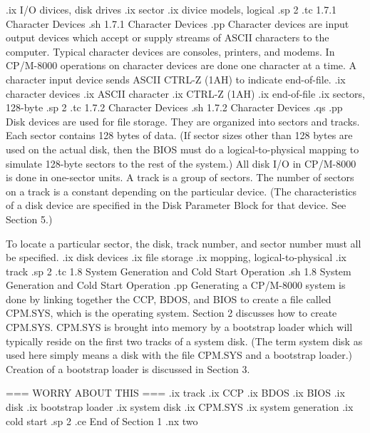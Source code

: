 .ix I/O divices, disk drives
.ix sector
.ix divice models, logical
.sp 2
.tc         1.7.1  Character Devices
.sh
1.7.1  Character Devices
.pp
Character devices are input output devices which accept or supply
streams of ASCII characters to the computer.  Typical character devices are
consoles, printers, and modems.  In CP/M-8000 operations on character devices
are done one character at a time.  A character input device sends ASCII
CTRL-Z (1AH) to indicate end-of-file.
.ix character devices
.ix ASCII character
.ix CTRL-Z (1AH)
.ix end-of-file
.ix sectors, 128-byte
.sp 2
.tc         1.7.2  Character Devices
.sh
1.7.2  Character Devices
.qs
.pp
Disk devices are used for file storage.  They are organized into sectors and 
tracks.  Each sector contains 128 bytes of data.  (If sector sizes other than
128 bytes are used on the actual disk, then the BIOS must do a 
logical-to-physical mapping to simulate 128-byte sectors to the rest of the 
system.)
All disk I/O in CP/M-8000 is done in one-sector units.  A track is a group of
sectors.  The number of sectors on a track is a constant depending on the
particular device.  (The characteristics of a disk device are specified in
the  Disk  Parameter  Block for  that  device.  See Section 5.)

To locate a particular sector, the disk, track number,
and sector number must all be specified.
.ix disk devices
.ix file storage
.ix mopping, logical-to-physical
.ix track
.sp 2
.tc    1.8  System Generation and Cold Start Operation
.sh
1.8  System Generation and Cold Start Operation
.pp
Generating a CP/M-8000 system is done by linking together the CCP, BDOS, and
BIOS to create a file called CPM.SYS, which is the operating system.
Section 2 discusses how to create CPM.SYS.  CPM.SYS is brought into memory
by a bootstrap loader which will typically reside on the first two tracks
of a system disk.  (The term system disk as used here simply means a disk
with the file CPM.SYS and a bootstrap loader.)  Creation of a bootstrap loader
is discussed in Section 3.

		=== WORRY ABOUT THIS ===
.ix track
.ix CCP
.ix BDOS
.ix BIOS
.ix disk
.ix bootstrap loader
.ix system disk
.ix CPM.SYS
.ix system generation
.ix cold start
.sp 2
.ce
End of Section 1
.nx two

